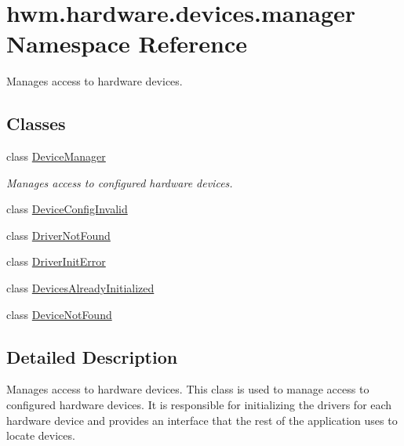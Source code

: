 \hypertarget{namespacehwm_1_1hardware_1_1devices_1_1manager}{\section{hwm.\-hardware.\-devices.\-manager Namespace Reference}
\label{namespacehwm_1_1hardware_1_1devices_1_1manager}
}


Manages access to hardware devices.  


\subsection*{Classes}
\begin{DoxyCompactItemize}
\item 
class \hyperlink{classhwm_1_1hardware_1_1devices_1_1manager_1_1_device_manager}{Device\-Manager}
\begin{DoxyCompactList}\small\item\em Manages access to configured hardware devices. \end{DoxyCompactList}\item 
class \hyperlink{classhwm_1_1hardware_1_1devices_1_1manager_1_1_device_config_invalid}{Device\-Config\-Invalid}
\item 
class \hyperlink{classhwm_1_1hardware_1_1devices_1_1manager_1_1_driver_not_found}{Driver\-Not\-Found}
\item 
class \hyperlink{classhwm_1_1hardware_1_1devices_1_1manager_1_1_driver_init_error}{Driver\-Init\-Error}
\item 
class \hyperlink{classhwm_1_1hardware_1_1devices_1_1manager_1_1_devices_already_initialized}{Devices\-Already\-Initialized}
\item 
class \hyperlink{classhwm_1_1hardware_1_1devices_1_1manager_1_1_device_not_found}{Device\-Not\-Found}
\end{DoxyCompactItemize}


\subsection{Detailed Description}
Manages access to hardware devices. This class is used to manage access to configured hardware devices. It is responsible for initializing the drivers for each hardware device and provides an interface that the rest of the application uses to locate devices. 